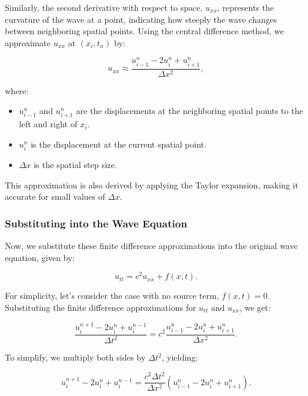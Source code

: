 \documentclass{article}
\begin{document}
			Similarly, the second derivative with respect to space, $u_{xx}$, represents the curvature of the wave at a point, indicating how steeply the wave changes between neighboring spatial points. Using the central difference method, we approximate $u_{xx}$ at $(x_i, t_n)$ by:
			
			\begin{equation}
				u_{xx} \approx \frac{u_{i-1}^n - 2u_i^n + u_{i+1}^n}{\Delta x^2},
			\end{equation}
			
			where:
			\begin{itemize}
				\item $u_{i-1}^n$ and $u_{i+1}^n$ are the displacements at the neighboring spatial points to the left and right of $x_i$.
				\item $u_i^n$ is the displacement at the current spatial point.
				\item $\Delta x$ is the spatial step size.
			\end{itemize}
			
			This approximation is also derived by applying the Taylor expansion, making it accurate for small values of $\Delta x$.
			
			\subsubsection{Substituting into the Wave Equation}
			
			Now, we substitute these finite difference approximations into the original wave equation, given by:
			
			\begin{equation}
				u_{tt} = c^2 u_{xx} + f(x, t).
			\end{equation}
			
			For simplicity, let’s consider the case with no source term, $f(x,t) = 0$. Substituting the finite difference approximations for $u_{tt}$ and $u_{xx}$, we get:
			
			\begin{equation}
				\frac{u_i^{n+1} - 2u_i^n + u_i^{n-1}}{\Delta t^2} = c^2 \frac{u_{i-1}^n - 2u_i^n + u_{i+1}^n}{\Delta x^2}.
			\end{equation}
			
			To simplify, we multiply both sides by $\Delta t^2$, yielding:
			
			\begin{equation}
				u_i^{n+1} - 2u_i^n + u_i^{n-1} = \frac{c^2 \Delta t^2}{\Delta x^2} \left( u_{i-1}^n - 2u_i^n + u_{i+1}^n \right).
			\end{equation}
			
\end{document}
